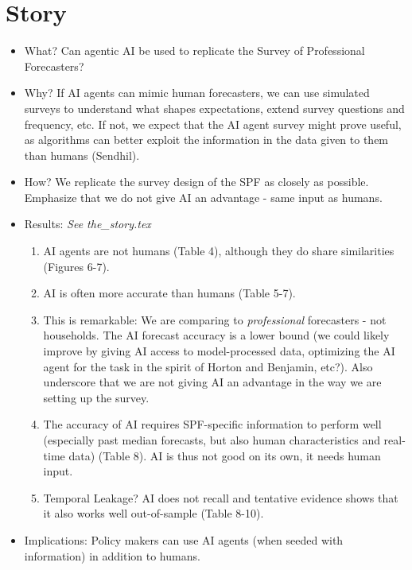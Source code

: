 \documentclass{article}
\begin{document}
\section*{Story} 
\begin{itemize}
    \item What? Can agentic AI be used to replicate the Survey of Professional Forecasters?
    \item Why? If AI agents can mimic human forecasters, we can use simulated surveys to understand what shapes expectations, extend survey questions and frequency, etc. If not, we expect that the AI agent survey might prove useful, as algorithms can better exploit the information in the data given to them than humans (Sendhil). 
    \item How? We replicate the survey design of the SPF as closely as possible. Emphasize that we do not give AI an advantage - same input as humans.
    \item Results: \emph{See the_story.tex}
    \begin{enumerate}
        \item AI agents are not humans (Table 4), although they do share similarities (Figures 6-7).
        \item AI is often more accurate than humans (Table 5-7).
        \item This is remarkable: We are comparing to \textit{professional} forecasters - not households. The AI forecast accuracy is a lower bound (we could likely improve by giving AI access to model-processed data, optimizing the AI agent for the task in the spirit of Horton and Benjamin, etc?). Also underscore that we are not giving AI an advantage in the way we are setting up the survey.
        \item The accuracy of AI requires SPF-specific information to perform well (especially past median forecasts, but also human characteristics and real-time data) (Table 8). AI is thus not good on its own, it needs human input.
        \item Temporal Leakage? AI does not recall and tentative evidence shows that it also works well out-of-sample (Table 8-10).
    \end{enumerate}
    \item Implications: Policy makers can use AI agents (when seeded with information) in addition to humans.
\end{itemize}
\end{document}
